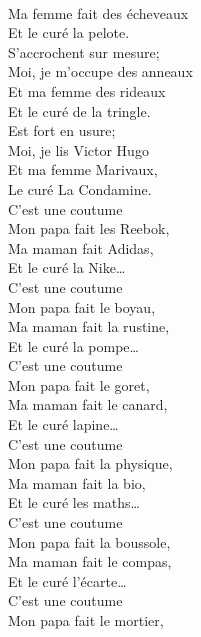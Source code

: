 \\Ma femme fait des écheveaux \bissimple
\\Et le curé la pelote. \bissimple
\\
{S'accrochent sur mesure;}
\\Moi, je m'occupe des anneaux \bissimple
\\Et ma femme des rideaux \bissimple
\\Et le curé de la tringle. \bissimple
\\
{Est fort en usure;}
\\Moi, je lis Victor Hugo \bissimple
\\Et ma femme Marivaux, \bissimple
\\Le curé La Condamine. \bissimple
\\
{C’est une coutume}
\\Mon papa fait les Reebok, \bissimple
\\Ma maman fait Adidas, \bissimple
\\Et le curé la Nike… \bissimple
\\
{C’est une coutume}
\\Mon papa fait le boyau, \bissimple
\\Ma maman fait la rustine, \bissimple
\\Et le curé la pompe… \bissimple
\\
{C’est une coutume}
\\Mon papa fait le goret, \bissimple
\\Ma maman fait le canard, \bissimple
\\Et le curé lapine… \bissimple
\\
{C’est une coutume}
\\Mon papa fait la physique, \bissimple
\\Ma maman fait la bio, \bissimple
\\Et le curé les maths… \bissimple
\breakpage
\\
{C’est une coutume}
\\Mon papa fait la boussole, \bissimple
\\Ma maman fait le compas, \bissimple
\\Et le curé l’écarte… \bissimple
\\
{C’est une coutume}
\\Mon papa fait le mortier, \bissimple
